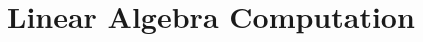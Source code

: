 \graphicspath{{Appendix/Figures/}}

% 

\chapter{Linear Algebra Computation}
\label{appendix}
\thispagestyle{myheadings}


